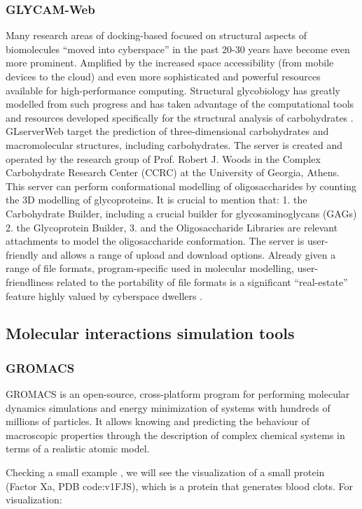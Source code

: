 \documentclass[11pt, letterpaper, english]{article}
\begin{document}
\subsubsection{GLYCAM-Web}
Many research areas of docking-based focused on structural aspects of biomolecules “moved into cyberspace” in the past 20-30 years have become even more prominent. Amplified by the increased space accessibility (from mobile devices to the cloud) and even more sophisticated and powerful resources available for high-performance computing. Structural glycobiology has greatly modelled from such progress and has taken advantage of the computational tools and resources developed specifically for the structural analysis of carbohydrates \cite{Yuriev_2015}.
GLserverWeb target the prediction of three-dimensional carbohydrates and macromolecular structures, including carbohydrates. 
The server is created and operated by the research group of Prof. Robert J. Woods in the Complex Carbohydrate Research Center (CCRC) at the University of Georgia, Athens. This server can perform conformational modelling of oligosaccharides by counting the 3D modelling of glycoproteins.  
It is crucial to mention that:
1. the Carbohydrate Builder, including a crucial builder for glycosaminoglycans (GAGs)
2. the Glycoprotein Builder, 
3. and the Oligosaccharide Libraries are relevant attachments to model the oligosaccharide conformation. The server is user-friendly and allows a range of upload and download options.
Already given a range of file formats, program-specific used in molecular modelling, user-friendliness related to the portability of file formats is a significant “real-estate” feature highly valued by cyberspace dwellers \cite{Yuriev_2015}.

    \subsection{Molecular interactions simulation tools}
                \subsubsection{GROMACS}
        \par{GROMACS is an open-source, cross-platform program for performing molecular dynamics simulations and energy minimization of systems with hundreds of millions of particles. It allows knowing and predicting the behaviour of macroscopic properties through the description of complex chemical systems in terms of a realistic atomic model.}
        \par{Checking a small example \cite{Villa_2017}, we will see the visualization of a small protein (Factor Xa, PDB code:v1FJS), which is a protein that generates blood clots. For visualization:}
        \\
        
\end{document}
